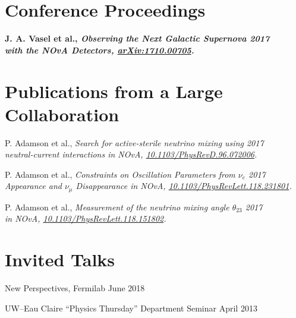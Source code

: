 \documentclass[11pt]{cv}
\begin{document}
\begin{cv}
\section{Conference Proceedings}
\begin{etaremune}
  \item \bf J. A. Vasel \rm et al., \it Observing the Next Galactic Supernova \rm \hfill 2017 \\
  \it with the NOvA Detectors, \rm \href{http://arxiv.org/abs/arXiv:1710.00705}{arXiv:1710.00705}.
\end{etaremune}


\section{Publications from a Large Collaboration}
\begin{etaremune}
  \item P. Adamson et al., \it Search for active-sterile neutrino mixing using \rm \hfill 2017 \\
  \it neutral-current interactions in NOvA, \rm \href{https://doi.org/10.1103/PhysRevD.96.072006}{10.1103/PhysRevD.96.072006}.
  \item P. Adamson et al., \it Constraints on Oscillation Parameters from $\nu_e$ \rm \hfill 2017 \\
  \it  Appearance and $\nu_\mu$ Disappearance in NOvA, \rm \href{https://doi.org/10.1103/PhysRevLett.118.231801}{10.1103/PhysRevLett.118.231801}.
  \item P. Adamson et al., \it Measurement of the neutrino mixing angle $\theta_{23}$ \rm \hfill 2017 \\
  \it in NOvA, \rm \href{https://doi.org/10.1103/PhysRevLett.118.151802}{10.1103/PhysRevLett.118.151802}.
\end{etaremune}


\section{Invited Talks}
\begin{etaremune}
  \item New Perspectives, Fermilab \hfill June 2018
  \item UW--Eau Claire ``Physics Thursday'' Department Seminar \hfill April 2013
\end{etaremune}



\end{cv}
\end{document}
